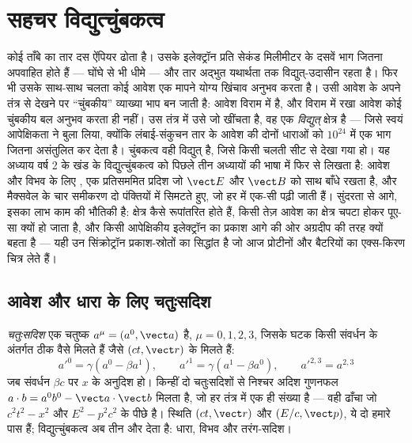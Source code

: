 \chapter{सहचर विद्युत्चुंबकत्व}\label{ch:b3:covariant-electromagnetism}

कोई ताँबे का तार दस ऐंपियर ढोता है। उसके इलेक्ट्रॉन प्रति सेकंड
मिलीमीटर के दसवें भाग जितना अपवाहित होते हैं --- घोंघे से भी धीमे ---
और तार अद्भुत यथार्थता तक विद्युत्-उदासीन रहता है। फिर भी उसके साथ-साथ
चलता कोई आवेश एक मापने योग्य खिंचाव अनुभव करता है। उसी आवेश के अपने
तंत्र से देखने पर ``चुंबकीय'' व्याख्या भाप बन जाती है: आवेश विराम में
है, और विराम में रखा आवेश कोई चुंबकीय बल अनुभव करता ही नहीं। उस तंत्र
में उसे जो खींचता है, वह एक \emph{विद्युत्} क्षेत्र है --- जिसे स्वयं
आपेक्षिकता ने बुला लिया, क्योंकि लंबाई-संकुचन तार के आवेश की दोनों
धाराओं को $10^{24}$ में एक भाग जितना असंतुलित कर देता है।
चुंबकत्व वही विद्युत् है, जिसे किसी चलती सीट से देखा गया हो। यह अध्याय
वर्ष 2 के खंड के विद्युत्चुंबकत्व को पिछले तीन अध्यायों की भाषा में
फिर से लिखता है: आवेश और विभव के लिए , एक प्रतिसममित
प्रदिश जो $\vect E$ और $\vect B$ को साथ बाँधे रखता है, और मैक्सवेल के
चार समीकरण दो पंक्तियों में सिमटते हुए, जो हर  में
एक-सी पढ़ी जाती हैं। सुंदरता से आगे, इसका लाभ काम की भौतिकी है: क्षेत्र
कैसे रूपांतरित होते हैं, किसी तेज़ आवेश का क्षेत्र चपटा होकर पूए-सा
क्यों हो जाता है, और किसी आपेक्षिकीय इलेक्ट्रॉन का प्रकाश आगे की ओर
अग्रदीप की तरह क्यों बहता है --- यही उन सिंक्रोट्रॉन प्रकाश-स्रोतों का
सिद्धांत है जो आज प्रोटीनों और बैटरियों का एक्स-किरण चित्र लेते हैं।

\section{आवेश और धारा के लिए चतुःसदिश}

\begin{definition}[चतुःसदिश]\label{def:b3:covariant-electromagnetism:fourvector}
\emph{चतुःसदिश} एक चतुष्क $a^\mu = (a^0, \vect a)$ है, $\mu =
0, 1, 2, 3$, जिसके घटक किसी संवर्धन के अंतर्गत ठीक वैसे मिलते हैं जैसे
$(ct,
\vect r)$ के मिलते हैं:
\[
a'^0 = \gamma(a^0 - \beta a^1) , \qquad
a'^1 = \gamma(a^1 - \beta a^0) , \qquad
a'^{2,3} = a^{2,3}
\]
जब संवर्धन $\beta c$ पर $x$ के अनुदिश हो। किन्हीं दो चतुःसदिशों से
निश्चर अदिश गुणनफल $a\cdot b = a^0b^0 - \vect a\cdot\vect b$ मिलता है,
जो हर तंत्र में एक ही संख्या है --- वही ढाँचा जो $c^2t^2 - x^2$
और $E^2 - p^2c^2$ के पीछे है। स्थिति $(ct, \vect r)$ और 
$(E/c, \vect p)$, ये दो हमारे पास हैं; विद्युत्चुंबकत्व अब तीन और
देता है: धारा, विभव और तरंग-सदिश।
\end{definition}


